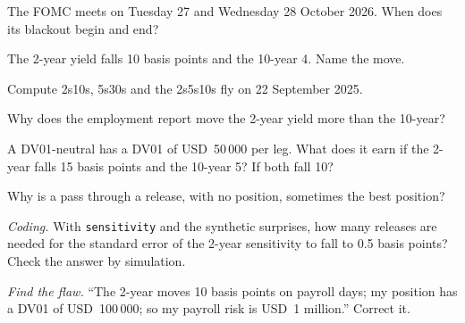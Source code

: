 \begin{exercise}[$\star$]\label{exo:m2:reading-a-macro-calendar-and-a-rates-screen:1}
The FOMC meets on Tuesday 27 and Wednesday 28 October 2026. When does its blackout begin
and end?
\end{exercise}

\begin{exercise}[$\star$]\label{exo:m2:reading-a-macro-calendar-and-a-rates-screen:2}
The 2-year yield falls 10 basis points and the 10-year 4. Name the move.
\end{exercise}

\begin{exercise}[$\star$]\label{exo:m2:reading-a-macro-calendar-and-a-rates-screen:3}
Compute 2s10s, 5s30s and the 2s5s10s fly on 22 September 2025.
\end{exercise}

\begin{exercise}[$\star\star$]\label{exo:m2:reading-a-macro-calendar-and-a-rates-screen:4}
Why does the employment report move the 2-year yield more than the 10-year?
\end{exercise}

\begin{exercise}[$\star\star$]\label{exo:m2:reading-a-macro-calendar-and-a-rates-screen:5}
A DV01-neutral  has a DV01 of USD~50\,000 per leg. What does it earn if the 2-year
falls 15 basis points and the 10-year 5? If both fall 10?
\end{exercise}

\begin{exercise}[$\star\star$]\label{exo:m2:reading-a-macro-calendar-and-a-rates-screen:6}
Why is a pass through a release, with no position, sometimes the best position?
\end{exercise}

\begin{exercise}[$\star\star\star$]\label{exo:m2:reading-a-macro-calendar-and-a-rates-screen:7}
\emph{Coding.} With \texttt{sensitivity} and the synthetic surprises, how many releases
are needed for the standard error of the 2-year sensitivity to fall to 0.5 basis points?
Check the answer by simulation.
\end{exercise}

\begin{exercise}[$\star\star\star$]\label{exo:m2:reading-a-macro-calendar-and-a-rates-screen:8}
\emph{Find the flaw.} ``The 2-year moves 10 basis points on payroll days; my position has a
DV01 of USD~100\,000; so my payroll risk is USD~1 million.'' Correct it.
\end{exercise}

